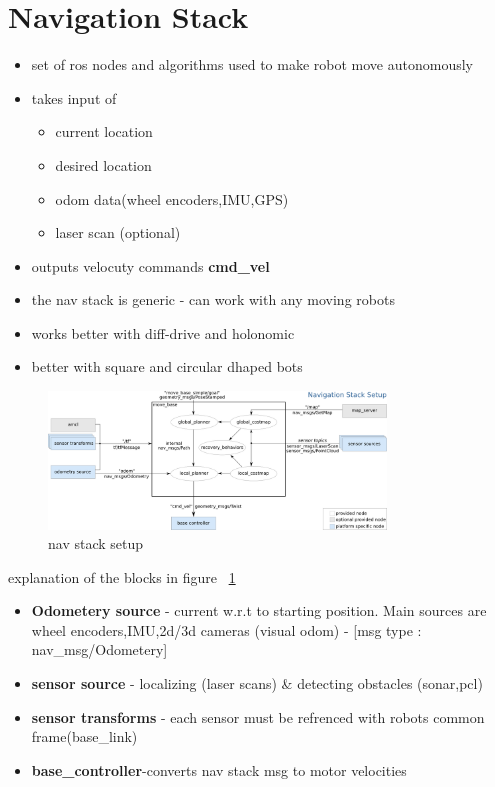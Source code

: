 \documentclass[a4paper]{article}
\begin{document}
    \section{Navigation Stack}
    \begin{itemize}
        \item set of ros nodes and algorithms used to make robot move autonomously
        \item takes input of 
            \begin{itemize}
                \item current location
                \item desired location
                \item odom data(wheel encoders,IMU,GPS) 
                \item laser scan (optional)
            \end{itemize}
        \item outputs velocuty commands \textbf{cmd\_vel}
        \item the nav stack is generic - can work with any moving robots
        \item works better with diff-drive and holonomic
        \item better with square and circular dhaped bots
    \end{itemize}
   \begin{figure}[h]
       \centering
       \includegraphics[width=0.8\textwidth]{./img/navstack-setup.png}
       \caption{nav stack setup}
       \label{fig:navstack}
   \end{figure} 
   explanation of the blocks in figure ~\ref{fig:navstack}
   \begin{itemize}
       \item \textbf{Odometery source} - current w.r.t to starting position. Main sources are wheel encoders,IMU,2d/3d cameras (visual odom) - [msg type : nav\_msg/Odometery]
       \item \textbf{sensor source } - localizing (laser scans) \& detecting obstacles (sonar,pcl)
       \item \textbf{sensor transforms} - each sensor must be refrenced with robots common frame(base\_link)
       \item \textbf{base\_controller}-converts nav stack msg to motor velocities
   \end{itemize}
\end{document}
